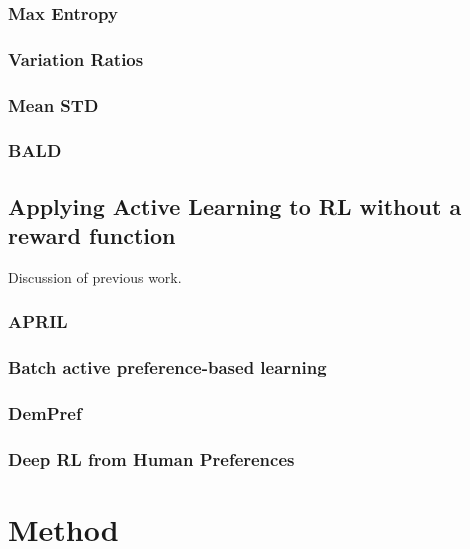 \documentclass[11pt, a4paper, bibliography=totoc]{report}
\begin{document}
\subsection{Max Entropy}

\subsection{Variation Ratios}

\subsection{Mean STD}

\subsection{BALD}

\section{Applying Active Learning to RL without a reward function}
Discussion of previous work.

\subsection{APRIL}

\subsection{Batch active preference-based learning}

\subsection{DemPref}

\subsection{Deep RL from Human Preferences}

\chapter{Method}
\end{document}

